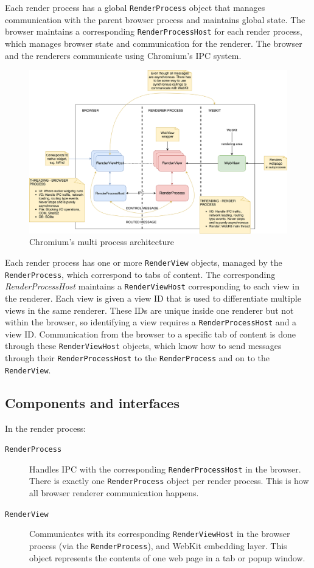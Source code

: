 Each render process has a global \texttt{RenderProcess} object that manages communication with the parent browser process and maintains global state. The browser maintains a corresponding \texttt{RenderProcessHost} for each render process, which manages browser state and communication for the renderer. The browser and the renderers communicate using Chromium's IPC system. 

\begin{figure}
    \centering
    \includegraphics[width=\textwidth]{img/multiprocess.png}
    \caption{Chromium's multi process architecture}
    \label{fig:arch}
\end{figure}

Each render process has one or more \texttt{RenderView} objects, managed by the \texttt{RenderProcess}, which correspond to tabs of content. The corresponding \textit{RenderProcessHost} maintains a \texttt{RenderViewHost} corresponding to each view in the renderer. Each view is given a view ID that is used to differentiate multiple views in the same renderer. These IDs are unique inside one renderer but not within the browser, so identifying a view requires a \texttt{RenderProcessHost} and a view ID. Communication from the browser to a specific tab of content is done through these \texttt{RenderViewHost} objects, which know how to send messages through their \texttt{RenderProcessHost} to the \texttt{RenderProcess} and on to the \texttt{RenderView}.

\subsection{Components and interfaces}

In the render process:
\begin{description}
\item[\texttt{RenderProcess}] Handles IPC with the corresponding \texttt{RenderProcessHost} in the browser. There is exactly one \texttt{RenderProcess} object per render process. This is how all browser renderer communication happens.
\item[\texttt{RenderView}] Communicates with its corresponding \texttt{RenderViewHost} in the browser process (via the \texttt{RenderProcess}), and WebKit embedding layer. This object represents the contents of one web page in a tab or popup window.
\end{description}

